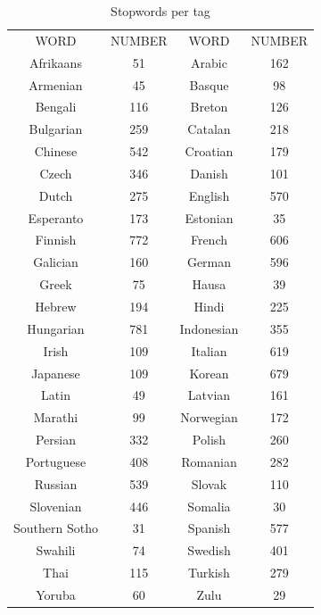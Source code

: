 \documentclass[sigconf,12pt,review=false,natbib=false]{acmart}
\begin{document}
\begin{table}[h!]
    \caption{Stopwords per tag}
    \label{tab:stopwords}
    \begin{minipage}{\columnwidth}
    \begin{center}
    \begin{tabular}{c c c c}
        \toprule
            WORD & NUMBER & WORD & NUMBER\\
        Afrikaans & 51 & Arabic & 162\\
        Armenian & 45 & Basque & 98 \\
        Bengali & 116 & Breton & 126 \\
        Bulgarian & 259 & Catalan & 218\\
        Chinese & 542 & Croatian & 179 \\
        Czech & 346 & Danish & 101 \\
        Dutch & 275 & English & 570 \\
        Esperanto & 173 & Estonian & 35 \\
        Finnish & 772 & French & 606 \\
        Galician & 160 & German & 596 \\
        Greek & 75 & Hausa & 39 \\
        Hebrew & 194 & Hindi & 225 \\
        Hungarian & 781 & Indonesian & 355 \\
        Irish & 109 & Italian & 619 \\
        Japanese & 109 & Korean & 679 \\
        Latin & 49 & Latvian & 161 \\
        Marathi & 99 & Norwegian & 172 \\
        Persian & 332 & Polish & 260 \\
        Portuguese & 408 & Romanian & 282 \\
        Russian & 539 & Slovak & 110 \\
        Slovenian & 446 & Somalia & 30 \\
        Southern Sotho & 31 & Spanish  & 577 \\
        Swahili & 74 & Swedish & 401 \\
        Thai & 115 & Turkish & 279 \\
        Yoruba & 60 & Zulu & 29 \\
    \end{tabular}
    \end{center}
    \end{minipage}
\end{table}
\end{document}
